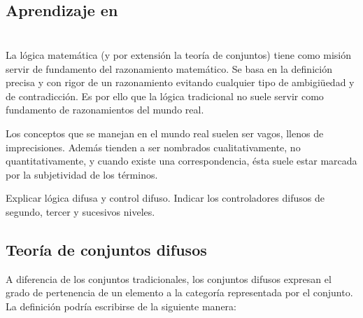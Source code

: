 \subsection{Aprendizaje en }

\section{}


La lógica matemática (y por extensión la teoría de conjuntos) tiene como misión servir de fundamento del razonamiento matemático. Se basa en la definición precisa y con rigor de un razonamiento evitando cualquier tipo de ambigiüedad y de contradicción. Es por ello que la lógica tradicional no suele servir como fundamento de razonamientos del mundo real.

Los conceptos que se manejan en el mundo real suelen ser vagos, llenos de imprecisiones. Además tienden a ser nombrados cualitativamente, no quantitativamente, y cuando existe una correspondencia, ésta suele estar marcada por la subjetividad de los términos.

Explicar lógica difusa y control difuso. Indicar los controladores difusos de segundo, tercer y sucesivos niveles.

\subsection{Teoría de conjuntos difusos}

A diferencia de los conjuntos tradicionales, los conjuntos difusos expresan el grado de pertenencia de un elemento a la categoría representada por el conjunto. La definición podría escribirse de la siguiente manera:

